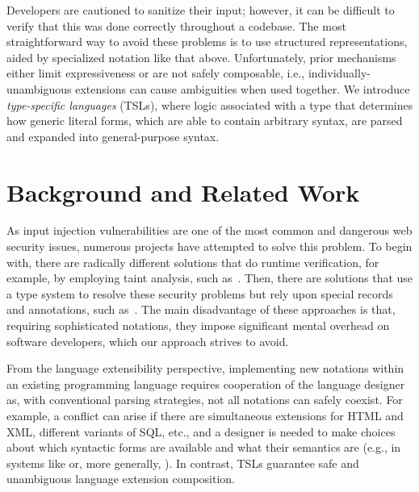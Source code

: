 \documentclass{sig-alternate}
\newcommand{\qs}[1]{}%
\begin{document}
Developers are cautioned to sanitize their input; however, it can be difficult to verify that this was done correctly throughout a codebase. The most straightforward way to avoid these problems is to use structured representations, aided by specialized notation like that above. Unfortunately, prior mechanisms either limit expressiveness or are not safely composable, i.e., individually-unambiguous extensions can cause ambiguities when used together. We introduce \emph{type-specific languages} (TSLs), where  logic associated with a type that determines how generic literal forms, which are able to contain arbitrary syntax, are parsed and expanded into general-purpose syntax. 

\section{Background and Related Work}
\qs{Describe the specialized (but pertinent) background necessary to appreciate the work. Include references to the literature where appropriate, and briefly explain where your work departs from that done by others.}

As input injection vulnerabilities are one of the most common and dangerous web security issues, numerous projects have attempted to solve this problem. To begin with, there are radically different solutions that do runtime verification, for example, by employing taint analysis, such as~\cite{fortify,wasp,PLAS12,scriptgard}. Then, there are solutions that use a type system to resolve these security problems but rely upon special records and annotations, such as~\cite{urOSDI,ur/Web,swift,swamy08fable}. The main disadvantage of these approaches is that, requiring sophisticated notations, they impose significant mental overhead on software developers, which our approach strives to avoid.

From the language extensibility perspective, implementing new notations within an existing programming language requires cooperation of the language designer as, with conventional parsing strategies, not all notations can safely coexist. For example, a conflict can arise if there are simultaneous extensions for HTML and XML, different variants of SQL, etc., and a designer is needed to make choices about which syntactic forms are available and what their semantics are (e.g., in systems like \cite{Erdweg:2011:SLL:2048147.2048199} or, more generally, \cite{Erdweg:2013:FEL:2517208.2517210}). In contrast, TSLs guarantee safe and unambiguous language extension composition.
\end{document}
